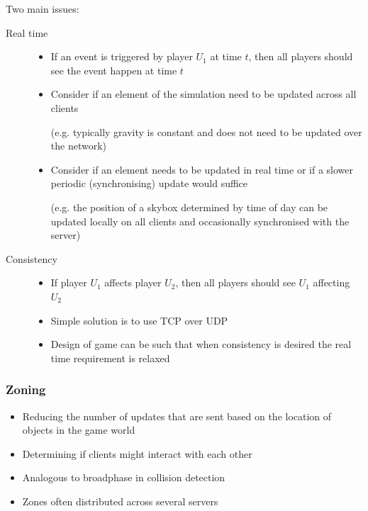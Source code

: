 \documentclass[a4paper]{article}
\begin{document}
Two main issues:
\begin{description}
  \item[Real time] \hfill
    \begin{itemize}
      \item
        If an event is triggered by player $U_{1}$ at time $t$, then all players
        should see the event happen at time $t$

      \item
        Consider if an element of the simulation need to be updated across all
        clients

        (e.g. typically gravity is constant and does not need to be updated over
        the network)

      \item
        Consider if an element needs to be updated in real time or if a slower
        periodic (synchronising) update would suffice

        (e.g. the position of a skybox determined by time of day can be updated
        locally on all clients and occasionally synchronised with the server)

    \end{itemize}

  \item[Consistency] \hfill
    \begin{itemize}
      \item
        If player $U_{1}$ affects player $U_{2}$, then all players should see
        $U_{1}$ affecting $U_{2}$

      \item
        Simple solution is to use TCP over UDP

      \item
        Design of game can be such that when consistency is desired the real
        time requirement is relaxed

    \end{itemize}

\end{description}

\subsubsection{Zoning}

\begin{itemize}
  \item
    Reducing the number of updates that are sent based on the location of
    objects in the game world

  \item
    Determining if clients might interact with each other

  \item
    Analogous to broadphase in collision detection

  \item
    Zones often distributed across several servers

\end{itemize}
\end{document}
